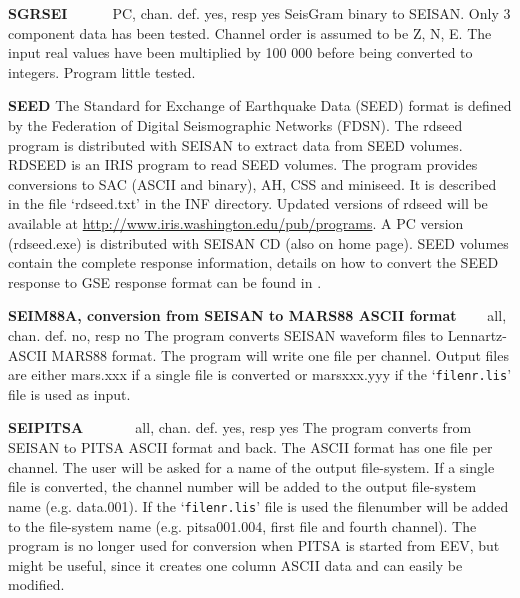 \textbf{SGRSEI} \verb|     | PC, chan. def. yes, resp yes \newline
{} 
SeisGram binary to SEISAN. Only 3 component data has been tested. Channel order is assumed to be Z, N, E. The input real values have been multiplied by 100 000 before being converted to integers. Program little tested. 

\textbf{SEED} \newline
The Standard for Exchange of Earthquake Data (SEED) format is defined by the Federation of Digital Seismographic Networks (FDSN). The rdseed program is distributed with SEISAN to extract data from SEED volumes. RDSEED is an IRIS program to read SEED volumes. The program provides conversions to SAC (ASCII and binary), AH, CSS and miniseed. It is described in the file `rdseed.txt' in the INF directory. Updated versions of rdseed will be available at \url{http://www.iris.washington.edu/pub/programs}. A PC version (rdseed.exe) is distributed with SEISAN CD (also on home page). SEED volumes contain the complete response information, details on how to convert the SEED response to GSE response format can be found in \citet{havskov2004}. 

\textbf{SEIM88A, conversion from SEISAN to MARS88 ASCII format} \verb|   | 
all, chan. def. no, resp no \newline
{}
The program converts SEISAN waveform files to Lennartz-ASCII MARS88 format. The program will write one file per channel. Output files are either mars.xxx if a single file is converted or marsxxx.yyy if the `\texttt{filenr.lis}' file is used as input. 

\textbf{SEIPITSA} \verb|      | all, chan. def. yes, resp yes \newline
{}The program converts from SEISAN to PITSA ASCII format and back. The ASCII format has one file per channel. The user will be asked for a name of the output file-system. If a single file is converted, the channel number will be added to the output file-system name (e.g. data.001). If the `\texttt{filenr.lis}' file is used the filenumber will be added to the file-system name (e.g. pitsa001.004, first file and fourth channel). The program is no longer used for conversion when PITSA is started from EEV, but might be useful, since it creates one column ASCII data and can easily be modified. 

